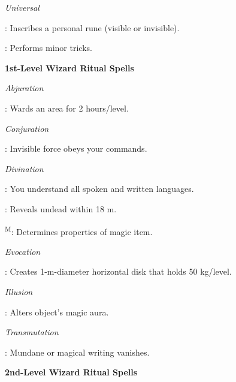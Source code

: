 \noindent\textit{Universal}
\begin{itemize*}
	\item[] : Inscribes a personal rune (visible or invisible).
	\item[] : Performs minor tricks.
\end{itemize*}


\noindent\textbf{1st-Level Wizard Ritual Spells}

\noindent\textit{Abjuration}
\begin{itemize*}
	\item[] : Wards an area for 2 hours/level.
\end{itemize*}

\noindent\textit{Conjuration}
\begin{itemize*}
	\item[] : Invisible force obeys your commands.
\end{itemize*}

\noindent\textit{Divination}
\begin{itemize*}
	\item[] : You understand all spoken and written languages.
	\item[] : Reveals undead within 18 m.
	\item[] \textsuperscript{M}: Determines properties of magic item.
\end{itemize*}

\noindent\textit{Evocation}
\begin{itemize*}
	\item[] : Creates 1-m-diameter horizontal disk that holds 50 kg/level.
\end{itemize*}

\noindent\textit{Illusion}
\begin{itemize*}
	\item[] : Alters object's magic aura.
\end{itemize*}

\noindent\textit{Transmutation}
\begin{itemize*}
	\item[] : Mundane or magical writing vanishes.
\end{itemize*}


\noindent\textbf{2nd-Level Wizard Ritual Spells}

